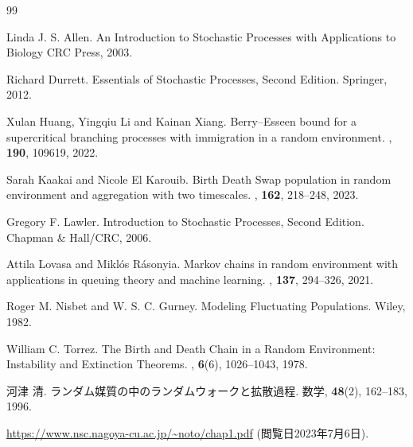 \documentclass[dvipdfmx]{jsarticle}
\numberwithin{equation}{section}
\theoremstyle{definition}
\newcommand{\0}{\bm{0}}
\newcommand{\1}{\bm{1}}
\begin{document}
\begin{thebibliography}{99}

    Linda J. S. Allen.
    \newblock An Introduction to Stochastic Processes with Applications to Biology
    \newblock CRC Press, 2003.

    Richard Durrett. 
    \newblock Essentials of Stochastic Processes, Second Edition.
    \newblock Springer, 2012.

    Xulan Huang, Yingqiu Li and Kainan Xiang.
    \newblock Berry–Esseen bound for a supercritical branching processes with immigration in a random environment.
    , {\bf 190}, 109619, 2022.

    Sarah Kaakai and Nicole El Karouib.
    \newblock Birth Death Swap population in random environment and aggregation with two timescales. 
    , {\bf 162}, 218--248, 2023.
    
    Gregory F. Lawler. 
    \newblock Introduction to Stochastic Processes, Second Edition.
    \newblock Chapman \& Hall/CRC, 2006.

    Attila Lovasa and Miklós Rásonyia. 
    \newblock Markov chains in random environment with applications in queuing theory and machine learning. 
    , {\bf 137}, 294--326, 2021.

    Roger M. Nisbet and W. S. C. Gurney.
    \newblock Modeling Fluctuating Populations.
    \newblock Wiley, 1982.

    William C. Torrez.
    \newblock The Birth and Death Chain in a Random Environment: Instability and Extinction Theorems.
    , {\bf 6}(6), 1026--1043, 1978.

    河津 清. 
    \newblock ランダム媒質の中のランダムウォークと拡散過程. 
    \newblock 数学, {\bf 48}(2), 162--183, 1996.

    \url{https://www.nsc.nagoya-cu.ac.jp/~noto/chap1.pdf} (閲覧日2023年7月6日).
  
\end{thebibliography}
\end{document}
